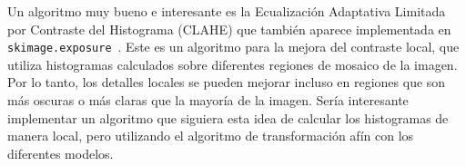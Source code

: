 Un algoritmo muy bueno e interesante es la Ecualización Adaptativa Limitada por Contraste del Histograma (CLAHE) que tambi\'en aparece implementada en \verb|skimage.exposure|~\cite{module_exposure}. Este es un algoritmo para la mejora del contraste local, que utiliza histogramas calculados sobre diferentes regiones de mosaico de la imagen. Por lo tanto, los detalles locales se pueden mejorar incluso en regiones que son más oscuras o más claras que la mayoría de la imagen. Ser\'ia interesante implementar un algoritmo que siguiera esta idea de calcular los histogramas de manera local, pero utilizando el algoritmo de transformaci\'on af\'in con los diferentes modelos.